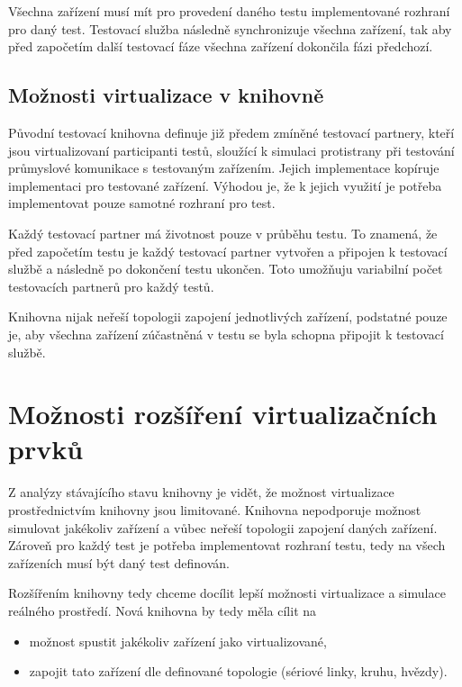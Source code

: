 Všechna zařízení musí mít pro provedení daného testu implementované rozhraní pro daný test. Testovací služba následně synchronizuje všechna zařízení, tak aby před započetím další testovací fáze všechna zařízení dokončila fázi předchozí. 

\subsection{Možnosti virtualizace v knihovně}

Původní testovací knihovna definuje již předem zmíněné testovací partnery, kteří jsou virtualizovaní participanti testů, sloužící k simulaci protistrany při testování průmyslové komunikace s testovaným zařízením. Jejich implementace kopíruje implementaci pro testované zařízení. Výhodou je, že k jejich využití je potřeba implementovat pouze samotné rozhraní pro test.

Každý testovací partner má životnost pouze v průběhu testu. To znamená, že před započetím testu je každý testovací partner vytvořen a připojen k testovací službě a následně po dokončení testu ukončen. Toto umožňuju variabilní počet testovacích partnerů pro každý testů.

Knihovna nijak neřeší topologii zapojení jednotlivých zařízení, podstatné pouze je, aby všechna zařízení zúčastněná v testu se byla schopna připojit k testovací službě. 


\section{Možnosti rozšíření virtualizačních prvků}

Z analýzy stávajícího stavu knihovny je vidět, že možnost virtualizace prostřednictvím knihovny jsou limitované. Knihovna nepodporuje možnost simulovat jakékoliv zařízení a vůbec neřeší topologii zapojení daných zařízení. Zároveň pro každý test je potřeba implementovat rozhraní testu, tedy na všech zařízeních musí být daný test definován. 

Rozšířením knihovny tedy chceme docílit lepší možnosti virtualizace a simulace reálného prostředí. Nová knihovna by tedy měla cílit na

\begin{itemize}
    \item možnost spustit jakékoliv zařízení jako virtualizované,
    \item zapojit tato zařízení dle definované topologie (sériové linky, kruhu, hvězdy).
\end{itemize}



